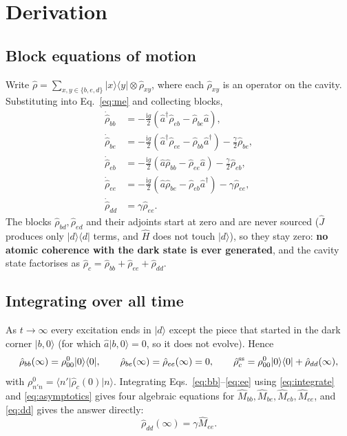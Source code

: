 \documentclass[11pt,a4paper]{article}
\newcommand{\ket}[1]{\lvert #1\rangle}
\newcommand{\bra}[1]{\langle #1\rvert}
\newcommand{\ketbra}[2]{\lvert #1\rangle\langle #2\rvert}
\newcommand{\rhoc}{\hat\rho_{c}}
\newcommand{\ii}{\mathrm{i}}
\begin{document}
\section{Derivation}

\subsection{Block equations of motion}

Write $\hat\rho=\sum_{x,y\in\{b,e,d\}}\ketbra{x}{y}\otimes\hat\rho_{xy}$, where
each $\hat\rho_{xy}$ is an operator on the cavity.  Substituting into
Eq.~\eqref{eq:me} and collecting blocks,
\begin{align}
  \dot{\hat\rho}_{bb}&=-\tfrac{\ii g}{2}
    \left(\hat a^{\dagger}\hat\rho_{eb}-\hat\rho_{be}\hat a\right),
  \label{eq:bb}\\
  \dot{\hat\rho}_{be}&=-\tfrac{\ii g}{2}
    \left(\hat a^{\dagger}\hat\rho_{ee}-\hat\rho_{bb}\hat a^{\dagger}\right)
    -\tfrac{\gamma}{2}\hat\rho_{be},
  \label{eq:be}\\
  \dot{\hat\rho}_{eb}&=-\tfrac{\ii g}{2}
    \left(\hat a\hat\rho_{bb}-\hat\rho_{ee}\hat a\right)
    -\tfrac{\gamma}{2}\hat\rho_{eb},
  \label{eq:eb}\\
  \dot{\hat\rho}_{ee}&=-\tfrac{\ii g}{2}
    \left(\hat a\hat\rho_{be}-\hat\rho_{eb}\hat a^{\dagger}\right)
    -\gamma\hat\rho_{ee},
  \label{eq:ee}\\
  \dot{\hat\rho}_{dd}&=\gamma\hat\rho_{ee}.
  \label{eq:dd}
\end{align}
The blocks $\hat\rho_{bd},\hat\rho_{ed}$ and their adjoints start at zero and
are never sourced ($\hat J$ produces only $\ketbra{d}{d}$ terms, and $\hat H$
does not touch $\ket d$), so they stay zero: \textbf{no atomic coherence with
the dark state is ever generated}, and the cavity state factorises as
$\rhoc=\hat\rho_{bb}+\hat\rho_{ee}+\hat\rho_{dd}$.

\subsection{Integrating over all time}

As $t\to\infty$ every excitation ends in $\ket d$ except the piece that started
in the dark corner $\ket{b,0}$ (for which $\hat a\ket{b,0}=0$, so it does not
evolve).  Hence
\begin{equation}
  \hat\rho_{bb}(\infty)=\rho^{0}_{00}\ketbra{0}{0},\qquad
  \hat\rho_{be}(\infty)=\hat\rho_{ee}(\infty)=0,\qquad
  \rhoc^{\rm ss}=\rho^{0}_{00}\ketbra{0}{0}+\hat\rho_{dd}(\infty),
  \label{eq:asymptotics}
\end{equation}
with $\rho^{0}_{n'n}=\bra{n'}\rhoc(0)\ket{n}$.  Integrating
Eqs.~\eqref{eq:bb}--\eqref{eq:ee} using \eqref{eq:integrate} and
\eqref{eq:asymptotics} gives four algebraic equations for
$\hat M_{bb},\hat M_{be},\hat M_{eb},\hat M_{ee}$, and \eqref{eq:dd} gives the
answer directly:
\begin{equation}
  \hat\rho_{dd}(\infty)=\gamma\hat M_{ee}.
  \label{eq:answer0}
\end{equation}
\end{document}
